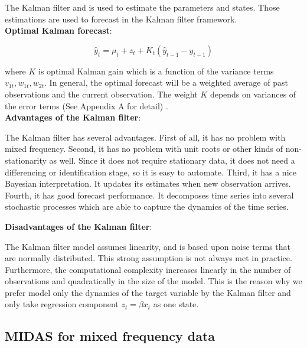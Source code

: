The Kalman filter and is used to estimate the parameters and states. Those estimations are used to forecast in the Kalman filter framework.\\




\textbf{Optimal Kalman forecast}: 	
		
$$\hat y_t =  \mu_t + z_t + K_t ( \hat y_{t-1} - y_{t-1} )$$


where $K$ is optimal Kalman gain which is a function of the variance terms $v_{1t},w_{1t}, w_{2t}$. In general, the optimal forecast will be a weighted average of past observations and the current observation. The weight $K$ depends on variances of the error terms (See Appendix A for detail) .\\ 


\textbf{Advantages of the Kalman filter}:

The Kalman filter has several advantages. First of all, it has no problem with mixed frequency. Second, it has no problem with unit roots or other kinds of non-stationarity as well. Since it does not require stationary data, it does not need a differencing or identification stage, so it is easy to automate. Third, it has a nice Bayesian interpretation. It updates its estimates when new observation arrives. Fourth, it has good forecast performance. It decomposes time series into several stochastic processes which are able to capture the dynamics of the time series.   




\textbf{Disadvantages of the Kalman filter}: 

The Kalman filter model assumes linearity, and is based upon noise terms that are normally distributed. This strong assumption is not always met in practice. Furthermore, the computational complexity increases linearly in the number of observations and quadratically in the size of the model. This is the reason why we prefer  model only the dynamics of the target variable by the Kalman filter and only take regression component $z_t = \beta x_t$ as one state.





\subsection{MIDAS for mixed frequency data}


